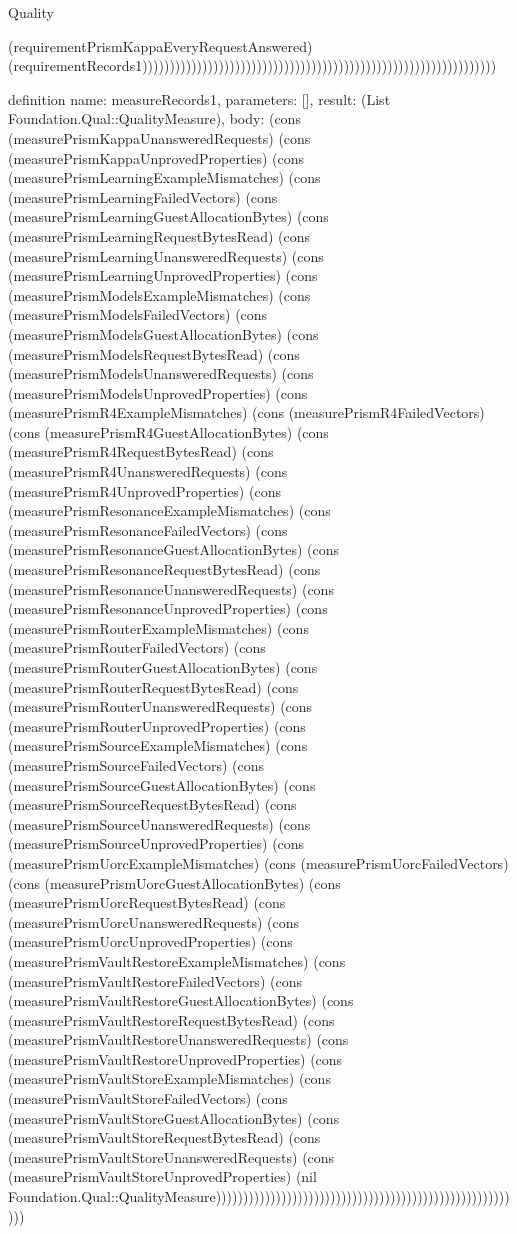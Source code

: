 \begin{lexlean}{Quality}
\begin{semanticmodule}
{(requirementPrismKappaEveryRequestAnswered) (requirementRecords1)))))))))))))))))))))))))))))))))))))))))))))))))))))))))))))))))
}

definition{
  name: measureRecords1,
  parameters: [],
  result: (List Foundation.Qual::QualityMeasure),
  body: (cons (measurePrismKappaUnansweredRequests) (cons (measurePrismKappaUnprovedProperties) (cons (measurePrismLearningExampleMismatches) (cons (measurePrismLearningFailedVectors) (cons (measurePrismLearningGuestAllocationBytes) (cons (measurePrismLearningRequestBytesRead) (cons (measurePrismLearningUnansweredRequests) (cons (measurePrismLearningUnprovedProperties) (cons (measurePrismModelsExampleMismatches) (cons (measurePrismModelsFailedVectors) (cons (measurePrismModelsGuestAllocationBytes) (cons (measurePrismModelsRequestBytesRead) (cons (measurePrismModelsUnansweredRequests) (cons (measurePrismModelsUnprovedProperties) (cons (measurePrismR4ExampleMismatches) (cons (measurePrismR4FailedVectors) (cons (measurePrismR4GuestAllocationBytes) (cons (measurePrismR4RequestBytesRead) (cons (measurePrismR4UnansweredRequests) (cons (measurePrismR4UnprovedProperties) (cons (measurePrismResonanceExampleMismatches) (cons (measurePrismResonanceFailedVectors) (cons (measurePrismResonanceGuestAllocationBytes) (cons (measurePrismResonanceRequestBytesRead) (cons (measurePrismResonanceUnansweredRequests) (cons (measurePrismResonanceUnprovedProperties) (cons (measurePrismRouterExampleMismatches) (cons (measurePrismRouterFailedVectors) (cons (measurePrismRouterGuestAllocationBytes) (cons (measurePrismRouterRequestBytesRead) (cons (measurePrismRouterUnansweredRequests) (cons (measurePrismRouterUnprovedProperties) (cons (measurePrismSourceExampleMismatches) (cons (measurePrismSourceFailedVectors) (cons (measurePrismSourceGuestAllocationBytes) (cons (measurePrismSourceRequestBytesRead) (cons (measurePrismSourceUnansweredRequests) (cons (measurePrismSourceUnprovedProperties) (cons (measurePrismUorcExampleMismatches) (cons (measurePrismUorcFailedVectors) (cons (measurePrismUorcGuestAllocationBytes) (cons (measurePrismUorcRequestBytesRead) (cons (measurePrismUorcUnansweredRequests) (cons (measurePrismUorcUnprovedProperties) (cons (measurePrismVaultRestoreExampleMismatches) (cons (measurePrismVaultRestoreFailedVectors) (cons (measurePrismVaultRestoreGuestAllocationBytes) (cons (measurePrismVaultRestoreRequestBytesRead) (cons (measurePrismVaultRestoreUnansweredRequests) (cons (measurePrismVaultRestoreUnprovedProperties) (cons (measurePrismVaultStoreExampleMismatches) (cons (measurePrismVaultStoreFailedVectors) (cons (measurePrismVaultStoreGuestAllocationBytes) (cons (measurePrismVaultStoreRequestBytesRead) (cons (measurePrismVaultStoreUnansweredRequests) (cons (measurePrismVaultStoreUnprovedProperties) (nil Foundation.Qual::QualityMeasure)))))))))))))))))))))))))))))))))))))))))))))))))))))))))
}


\end{semanticmodule}
\end{lexlean}

